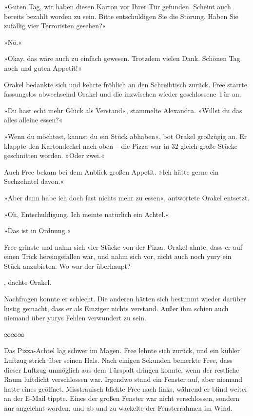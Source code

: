 »Guten Tag, wir haben diesen Karton vor Ihrer Tür gefunden. Scheint auch bereits bezahlt worden zu sein. Bitte entschuldigen Sie die Störung. Haben Sie zufällig vier Terroristen gesehen?«

»Nö.«

»Okay, das wäre auch zu einfach gewesen. Trotzdem vielen Dank. Schönen Tag noch und guten Appetit!«

Orakel bedankte sich und kehrte fröhlich an den Schreibtisch zurück. Free starrte fassungslos abwechselnd Orakel und die inzwischen wieder geschlossene Tür an.

»Du hast echt mehr Glück als Verstand«, stammelte Alexandra. »Willst du das alles alleine essen?«

»Wenn du möchtest, kannst du ein Stück abhaben«, bot Orakel großzügig an. Er klappte den Kartondeckel nach oben – die Pizza war in 32 gleich große Stücke geschnitten worden. »Oder zwei.«

Auch Free bekam bei dem Anblick großen Appetit. »Ich hätte gerne ein Sechzehntel davon.«

»Aber dann habe ich doch fast nichts mehr zu essen«, antwortete Orakel entsetzt.

»Oh, Entschuldigung. Ich meinte natürlich ein Achtel.«

»Das ist in Ordnung.«

Free grinste und nahm sich vier Stücke von der Pizza. Orakel ahnte, dass er auf einen Trick hereingefallen war, und nahm sich vor, nicht auch noch yury ein Stück anzubieten. Wo war der überhaupt?

, dachte Orakel. 

Nachfragen konnte er schlecht. Die anderen hätten sich bestimmt wieder darüber lustig gemacht, dass er als Einziger nichts verstand. Außer ihm schien auch niemand über yurys Fehlen verwundert zu sein.

\begin{center}
	∞∞∞
\end{center}

Das Pizza-Achtel lag schwer im Magen. Free lehnte sich zurück, und ein kühler Luftzug strich über seinen Hals. Nach einigen Sekunden bemerkte Free, dass dieser Luftzug unmöglich aus dem Türspalt dringen konnte, wenn der restliche Raum luftdicht verschlossen war. Irgendwo stand ein Fenster auf, aber niemand hatte eines geöffnet. Misstrauisch blickte Free nach links, während er blind weiter an der E-Mail tippte. Eines der großen Fenster war nicht verschlossen, sondern nur angelehnt worden, und ab und zu wackelte der Fensterrahmen im Wind.

